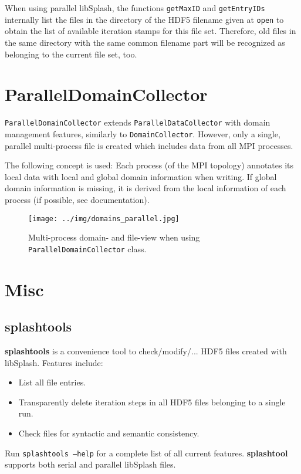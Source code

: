 \documentclass[a4paper,10pt,BCOR12mm]{report}
\newcommand{\command}[1]{\small \texttt{#1}}
\newcommand{\code}[1]{\small \texttt{#1}}
\begin{document}
When using parallel libSplash, the functions \code{getMaxID} and \code{getEntryIDs}
internally list the files in the directory of the HDF5 filename given at \code{open}
to obtain the list of available iteration stamps for this file set.
Therefore, old files in the same directory with the same common filename part will be recognized as belonging
to the current file set, too.



\chapter{ParallelDomainCollector}

\code{ParallelDomainCollector} extends \code{ParallelDataCollector} with domain management features,
similarly to \code{DomainCollector}.
However, only a single, parallel multi-process file is created which includes data from all MPI processes.

The following concept is used: Each process (of the MPI topology)
annotates its local data with local and global domain information when writing.
If global domain information is missing, it is derived from the local information of each process
(if possible, see documentation).

\begin{figure}[h]
 \texttt{[image: ../img/domains\_parallel.jpg]}
 \caption{Multi-process domain- and file-view when using \code{ParallelDomainCollector} class.}
\end{figure}


\chapter{Misc}


\section{splashtools}

\textbf{splashtools} is a convenience tool to check/modify/... HDF5 files created with libSplash.
Features include:
\begin{itemize}
	\item List all file entries.
	\item Transparently delete iteration steps in all HDF5 files belonging to a single run.
	\item Check files for syntactic and semantic consistency.
\end{itemize}
Run \command{splashtools --help} for a complete list of all current features.
\textbf{splashtool} supports both serial and parallel libSplash files.
\end{document}
